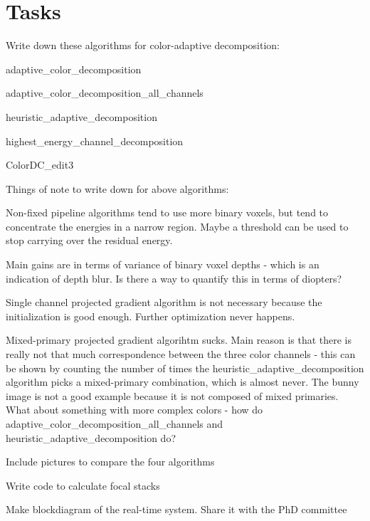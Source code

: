 \section{Tasks}
\begin{compact_todolist}
\item Write down these algorithms for color-adaptive decomposition:
    \begin{compact_todolist}
    \item adaptive\_color\_decomposition
    \item adaptive\_color\_decomposition\_all\_channels
    \item heuristic\_adaptive\_decomposition
    \item highest\_energy\_channel\_decomposition
    \item ColorDC\_edit3
    \end{compact_todolist}
\item Things of note to write down for above algorithms:
    \begin{compact_todolist}
    \item Non-fixed pipeline algorithms tend to use more binary voxels, but tend to concentrate the energies in a narrow region. Maybe a threshold can be used to stop carrying over the residual energy. 
    \item Main gains are in terms of variance of binary voxel depths - which is an indication of depth blur. Is there a way to quantify this in terms of diopters?
    \item Single channel projected gradient algorithm is not necessary because the initialization is good enough. Further optimization never happens.
    \item Mixed-primary projected gradient algorihtm sucks. Main reason is that there is really not that much correspondence between the three color channels - this can be shown by counting the number of times the heuristic\_adaptive\_decomposition algorithm picks a mixed-primary combination, which is almost never. The bunny image is not a good example because it is not composed of mixed primaries. What about something with more complex colors - how do adaptive\_color\_decomposition\_all\_channels and heuristic\_adaptive\_decomposition do?
    \end{compact_todolist}
\item Include pictures to compare the four algorithms
\item Write code to calculate focal stacks
\item Make blockdiagram of the real-time system. Share it with the PhD committee
\end{compact_todolist}
